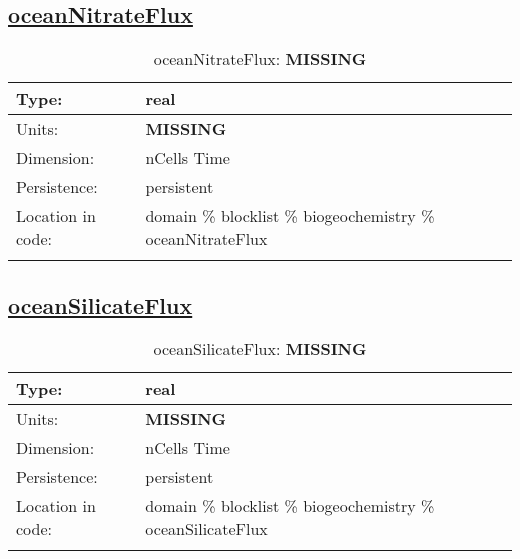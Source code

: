 \subsection[oceanNitrateFlux]{\hyperref[sec:var_tab_biogeochemistry]{oceanNitrateFlux}}
\label{subsec:var_sec_biogeochemistry_oceanNitrateFlux}
\begin{center}
\begin{longtable}{| p{2.0in} | p{4.0in} |}
        \hline 
        Type: & real \\
        \hline 
        Units: & {\bf \color{red} MISSING} \\
        \hline 
        Dimension: & nCells Time \\
        \hline 
        Persistence: & persistent \\
        \hline 
         Location in code: & domain \% blocklist \% biogeochemistry \% oceanNitrateFlux \\
         \hline 
    \caption{oceanNitrateFlux: {\bf \color{red} MISSING}}
\end{longtable}
\end{center}
\subsection[oceanSilicateFlux]{\hyperref[sec:var_tab_biogeochemistry]{oceanSilicateFlux}}
\label{subsec:var_sec_biogeochemistry_oceanSilicateFlux}
\begin{center}
\begin{longtable}{| p{2.0in} | p{4.0in} |}
        \hline 
        Type: & real \\
        \hline 
        Units: & {\bf \color{red} MISSING} \\
        \hline 
        Dimension: & nCells Time \\
        \hline 
        Persistence: & persistent \\
        \hline 
         Location in code: & domain \% blocklist \% biogeochemistry \% oceanSilicateFlux \\
         \hline 
    \caption{oceanSilicateFlux: {\bf \color{red} MISSING}}
\end{longtable}
\end{center}
